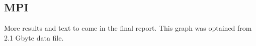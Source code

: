 \documentclass[a4paper,10pt]{article}
\begin{document}

\clearpage
\subsection{MPI}
  More results and text to come in the final report.  This graph was optained from 2.1 Gbyte data file.
  
\end{document}
